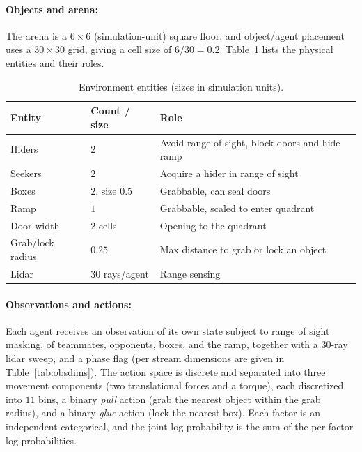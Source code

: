 \documentclass{article}
\begin{document}
\paragraph{Objects and arena:}
The arena is a $6\times6$ (simulation-unit) square floor, and object/agent
placement uses a $30\times30$ grid, giving a cell size of $6/30=0.2$.
Table~\ref{tab:objects} lists the physical entities and their roles.

\begin{table}[H]
  \centering
  \caption{Environment entities (sizes in simulation units).}
  \label{tab:objects}
  \begin{tabular}{lll}
    \toprule
    Entity & Count / size & Role \\
    \midrule
    Hiders           & $2$                        & Avoid range of sight, block doors and hide ramp \\
    Seekers          & $2$                        & Acquire a hider in range of sight \\
    Boxes            & $2$, size $0.5$            & Grabbable, can seal doors \\
    Ramp             & $1$                        & Grabbable, scaled to enter quadrant \\
    Door width    & $2$ cells                     & Opening to the quadrant \\
    Grab/lock radius & $0.25$                     & Max distance to grab or lock an object \\
    Lidar            & $30$ rays/agent            & Range sensing \\
    \bottomrule
  \end{tabular}
\end{table}

\paragraph{Observations and actions:}
Each agent receives an observation of its own state subject to range of sight masking, of teammates, opponents, boxes, and the ramp, together with a $30$-ray lidar sweep, and a phase flag (per stream dimensions are given in Table~\ref{tab:obsdims}). The action space is discrete and separated into three movement components (two translational forces and a torque), each discretized into $11$ bins, a binary \emph{pull} action (grab the nearest object within the
grab radius), and a binary \emph{glue} action (lock the nearest box). Each factor
is an independent categorical, and the joint log-probability is the sum of the
per-factor log-probabilities.
\end{document}
